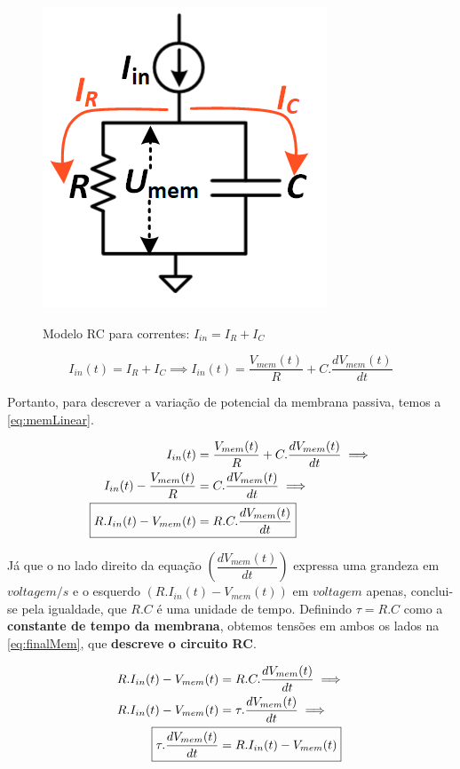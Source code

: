 			\begin{figure}[H]
				\centering
				\caption[Modelo RC para correntes]{Modelo RC para correntes: $I_{in} = I_R + I_C$}
				\includegraphics[width=0.3\linewidth]{images/rcmodel2}
				\label{fig:rcmodel2}
			\end{figure}
			
			\begin{equation}
				\label{eq:totalNeuronCurrent}
				I_{in}(t) = I_R + I_C \implies I_{in}(t) = \frac{V_{mem}(t)}{R} + C.\dfrac{dV_{mem}(t)}{dt}
			\end{equation}
		
			\par Portanto, para descrever a variação de potencial da membrana passiva, temos a \autoref{eq:memLinear}.
			
			\begin{equation}
				\label{eq:memLinear}
				\begin{aligned}
					I_{in}(t) &= \frac{V_{mem}(t)}{R} + C.\dfrac{dV_{mem}(t)}{dt} \implies \\ 
					I_{in}(t) - \frac{V_{mem}(t)}{R} &=  C.\dfrac{dV_{mem}(t)}{dt} \implies \\
					\Aboxed{R.I_{in}(t) - V_{mem}(t) &=  R.C.\dfrac{dV_{mem}(t)}{dt}}
				\end{aligned}
			\end{equation}
			
			\par Já que o no lado direito da equação $\left(\dfrac{dV_{mem}(t)}{dt}\right)$ expressa uma  grandeza em $voltagem/s$ e o esquerdo $\left(R.I_{in}(t) - V_{mem}(t)\right)$ em $voltagem$ apenas, conclui-se pela igualdade, que $R.C$ é uma unidade de tempo. Definindo $\tau = R.C$ como a \textbf{constante de tempo da membrana}, obtemos tensões em ambos os lados na \autoref{eq:finalMem}, que \textbf{descreve o circuito RC}.
			
			\begin{equation}
				\label{eq:finalMem}
				\begin{aligned}
					R.I_{in}(t) - V_{mem}(t) &=  R.C.\dfrac{dV_{mem}(t)}{dt} \implies \\
					R.I_{in}(t) - V_{mem}(t) &=  \tau.\dfrac{dV_{mem}(t)}{dt} \implies \\
					\Aboxed{\tau.\dfrac{dV_{mem}(t)}{dt} &= R.I_{in}(t) - V_{mem}(t)}
				\end{aligned}
			\end{equation}
			
